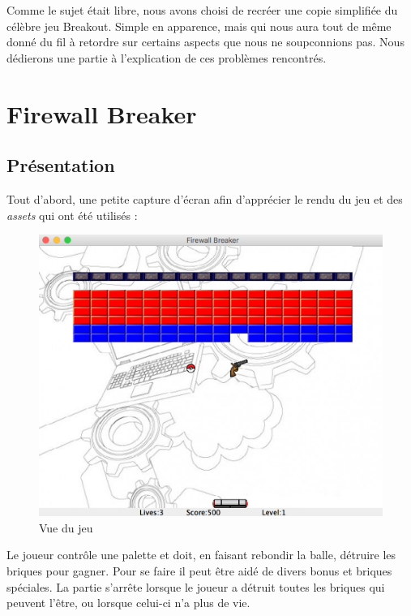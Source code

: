 \documentclass[a4paper,10pt]{article}
\begin{document}
Comme le sujet était libre, nous avons choisi de recréer une copie simplifiée du célèbre jeu Breakout.
Simple en apparence, mais qui nous aura tout de même donné du fil à retordre sur certains aspects
que nous ne soupconnions pas. Nous dédierons une partie à l'explication de ces problèmes rencontrés.


\section{Firewall Breaker}
\subsection{Présentation}
    Tout d'abord, une petite capture d'écran afin d'apprécier le rendu du jeu et des \textit{assets} qui ont été
    utilisés  :

\FloatBarrier
		\begin{figure}[!h]
    		\begin{center}
	   	  	\includegraphics[scale= 0.5]{images/gameView.png}
          	\caption{Vue du jeu}
    		\end{center}
		\end{figure}
\FloatBarrier

Le joueur contrôle une palette et doit, en faisant rebondir la balle, détruire les briques pour gagner.
Pour se faire il peut être aidé de divers bonus et briques spéciales. La partie s'arrête lorsque le joueur
a détruit toutes les briques qui peuvent l'être, ou lorsque celui-ci n'a plus de vie.
\end{document}
